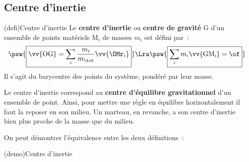 \documentclass[../../main/main.tex]{subfiles}
\begin{document}
\subsection{Centre d'inertie}

\begin{tcb*}(defi){Centre d'inertie}
	Le \textbf{centre d'inertie} ou \textbf{centre de gravité} G d'un ensemble
	de points matériels M$_i$ de masses $m_i$ est défini par~:
	\[
		\psw{
			\boxed{\vv{\rm OG} = \sum_i \frac{m_i}{m_{\tot}} \vv{{\OMr}_i}}
		}
		\Lra
		\psw{
			\boxed{\sum_i m_i \vv{\rm GM_i} = \of }
		}
	\]
	Il s'agit du barycentre des points du système, pondéré par leur masse.
\end{tcb*}

Le centre d'inertie correspond au \textbf{centre d'équilibre gravitationnel}
d'un ensemble de point. Ainsi, pour mettre une règle en équilibre
horizontalement il faut la reposer en son milieu. Un marteau, en revanche, a son
centre d'inertie bien plus proche de la masse que du milieu.

On peut démontrer l'équivalence entre les deux définitions~:
\begin{tcb*}(demo){Centre d'inertie}
\end{tcb*}
\end{document}
